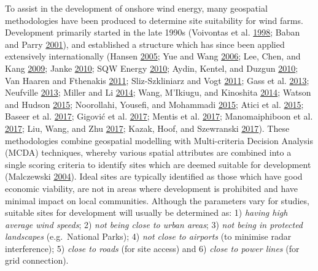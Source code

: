 \documentclass[a4paper,]{article}
\theoremstyle{definition}
\theoremstyle{definition}
\theoremstyle{definition}
\theoremstyle{remark}
\begin{document}
To assist in the development of onshore wind energy, many geospatial
methodologies have been produced to determine site suitability for wind
farms. Development primarily started in the late 1990s (Voivontas et al.
\protect\hyperlink{ref-Voivontas1998}{1998}; Baban and Parry
\protect\hyperlink{ref-Baban2001}{2001}), and established a structure
which has since been applied extensively internationally (Hansen
\protect\hyperlink{ref-Hansen2005}{2005}; Yue and Wang
\protect\hyperlink{ref-Yue2006}{2006}; Lee, Chen, and Kang
\protect\hyperlink{ref-Lee2009}{2009}; Janke
\protect\hyperlink{ref-Janke2010}{2010}; SQW Energy
\protect\hyperlink{ref-SQWEnergy2010}{2010}; Aydin, Kentel, and Duzgun
\protect\hyperlink{ref-Aydin2010}{2010}; Van Haaren and Fthenakis
\protect\hyperlink{ref-VanHaaren2011}{2011}; Sliz-Szkliniarz and Vogt
\protect\hyperlink{ref-Sliz-Szkliniarz2011}{2011}; Gass et al.
\protect\hyperlink{ref-Gass2013}{2013}; Neufville
\protect\hyperlink{ref-Neufville2013}{2013}; Miller and Li
\protect\hyperlink{ref-Miller2014}{2014}; Wang, M'Ikiugu, and Kinoshita
\protect\hyperlink{ref-Wang2014}{2014}; Watson and Hudson
\protect\hyperlink{ref-Watson2015}{2015}; Noorollahi, Yousefi, and
Mohammadi \protect\hyperlink{ref-Noorollahi2015}{2015}; Atici et al.
\protect\hyperlink{ref-Atici2015}{2015}; Baseer et al.
\protect\hyperlink{ref-Baseer2017}{2017}; Gigović et al.
\protect\hyperlink{ref-Gigovic2017}{2017}; Mentis et al.
\protect\hyperlink{ref-Mentis2017}{2017}; Manomaiphiboon et al.
\protect\hyperlink{ref-Manomaiphiboon2017}{2017}; Liu, Wang, and Zhu
\protect\hyperlink{ref-Liu2017}{2017}; Kazak, Hoof, and Szewranski
\protect\hyperlink{ref-Kazak2017}{2017}). These methodologies combine
geospatial modelling with Multi-criteria Decision Analysis (MCDA)
techniques, whereby various spatial attributes are combined into a
single scoring criteria to identify sites which are deemed suitable for
development (Malczewski \protect\hyperlink{ref-Malczewski2004}{2004}).
Ideal sites are typically identified as those which have good economic
viability, are not in areas where development is prohibited and have
minimal impact on local communities. Although the parameters vary for
studies, suitable sites for development will usually be determined as:
1) \emph{having high average wind speeds}; 2) \emph{not being close to
urban areas}; 3) \emph{not being in protected landscapes} (e.g.~National
Parks); 4) \emph{not close to airports} (to minimise radar
interference); 5) \emph{close to roads} (for site access) and 6)
\emph{close to power lines} (for grid connection).
\end{document}
